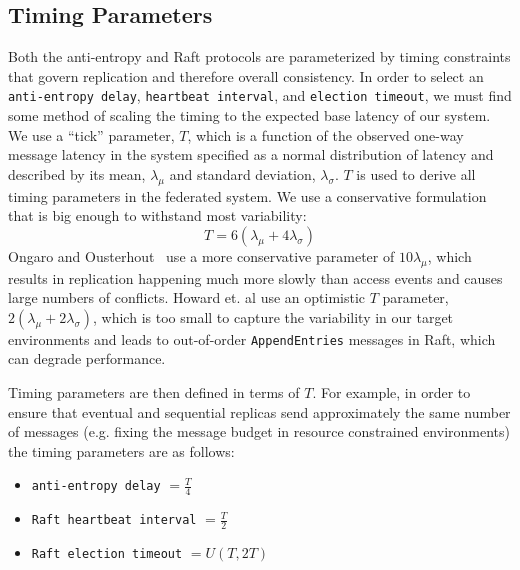 \documentclass[10pt,conference,letterpaper]{IEEEtran}
\begin{document}
\subsection{Timing Parameters}

Both the anti-entropy and Raft protocols are parameterized by timing constraints that govern replication and therefore overall consistency.
In order to select an \texttt{anti-entropy delay}, \texttt{heartbeat
interval}, and \texttt{election timeout}, we must find some method of
scaling the timing to the expected base latency of our system.
We use a ``tick'' parameter, $T$, which is a function of
the observed one-way message latency in the system specified as a normal distribution of latency and described by its mean, $\lambda_{\mu}$ and standard deviation,
$\lambda_{\sigma}$.
$T$ is used to derive all timing parameters in the federated system.
We use a conservative formulation that is
big enough to withstand most variability:
\begin{equation}
    T = 6(\lambda_{\mu} + 4\lambda_{\sigma})
\end{equation}
Ongaro and Ousterhout~\cite{ongaro_search_2014} use a more conservative
parameter of $10\lambda_{\mu}$, which results in replication happening much
more slowly than access events and causes large numbers of conflicts.
Howard et.
al \cite{howard_raft_2015} use an
optimistic $T$ parameter, $2\left(\lambda_{\mu} + 2\lambda_{\sigma}\right)$, which is too small to capture
the variability in our target environments and leads to out-of-order
\texttt{AppendEntries} messages in Raft, which can degrade performance.

Timing parameters are then defined in terms of $T$.
For example, in order to ensure that eventual and sequential replicas send approximately
the same number of messages (e.g.
fixing the message budget in resource constrained environments) the timing
parameters are as follows:
\begin{itemize}
    \item \texttt{anti-entropy delay} $= \frac{T}{4}$
    \item \texttt{Raft heartbeat interval} $= \frac{T}{2}$
    \item \texttt{Raft election timeout} $= U(T, 2T)$
\end{itemize}

\end{document}
